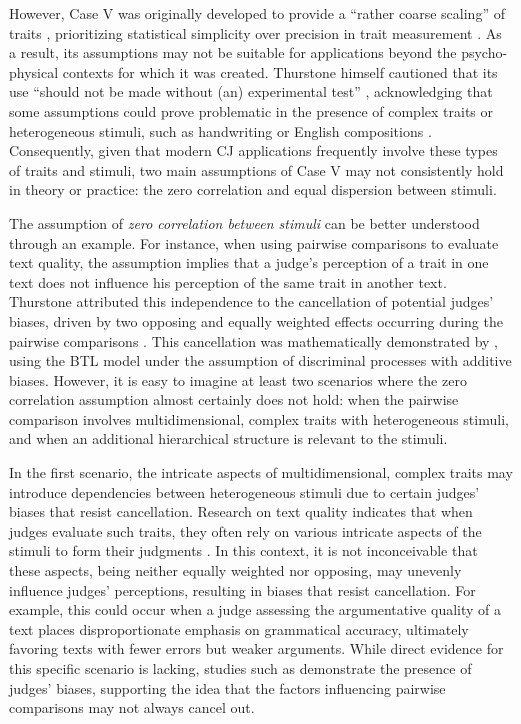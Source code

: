 \documentclass[
  authoryear,
  preprint,
  1p]{elsarticle}
\begin{document}
However, Case V was originally developed to provide a ``rather coarse
scaling'' of traits \citep[pp.~269]{Thurstone_1927b}, prioritizing
statistical simplicity over precision in trait measurement
\citep[pp.~677]{Kelly_et_al_2022}. As a result, its assumptions may not
be suitable for applications beyond the psycho-physical contexts for
which it was created. Thurstone himself cautioned that its use ``should
not be made without (an) experimental test''
\citep[pp.~270]{Thurstone_1927b}, acknowledging that some assumptions
could prove problematic in the presence of complex traits or
heterogeneous stimuli, such as handwriting or English compositions
\citep[pp.~374]{Thurstone_1927a}. Consequently, given that modern CJ
applications frequently involve these types of traits and stimuli, two
main assumptions of Case V may not consistently hold in theory or
practice: the zero correlation and equal dispersion between stimuli.

The assumption of \emph{zero correlation between stimuli} can be better
understood through an example. For instance, when using pairwise
comparisons to evaluate text quality, the assumption implies that a
judge's perception of a trait in one text does not influence his
perception of the same trait in another text. Thurstone attributed this
independence to the cancellation of potential judges' biases, driven by
two opposing and equally weighted effects occurring during the pairwise
comparisons \citep[pp.~268]{Thurstone_1927b}. This cancellation was
mathematically demonstrated by \citet{Andrich_1978}, using the BTL model
under the assumption of discriminal processes with additive biases.
However, it is easy to imagine at least two scenarios where the zero
correlation assumption almost certainly does not hold: when the pairwise
comparison involves multidimensional, complex traits with heterogeneous
stimuli, and when an additional hierarchical structure is relevant to
the stimuli.

In the first scenario, the intricate aspects of multidimensional,
complex traits may introduce dependencies between heterogeneous stimuli
due to certain judges' biases that resist cancellation. Research on text
quality indicates that when judges evaluate such traits, they often rely
on various intricate aspects of the stimuli to form their judgments
\citep{vanDaal_et_al_2016, Lesterhuis_2018, Chambers_et_al_2022}. In
this context, it is not inconceivable that these aspects, being neither
equally weighted nor opposing, may unevenly influence judges'
perceptions, resulting in biases that resist cancellation. For example,
this could occur when a judge assessing the argumentative quality of a
text places disproportionate emphasis on grammatical accuracy,
ultimately favoring texts with fewer errors but weaker arguments. While
direct evidence for this specific scenario is lacking, studies such as
\citet{Pollitt_et_al_2003} demonstrate the presence of judges' biases,
supporting the idea that the factors influencing pairwise comparisons
may not always cancel out.
\end{document}
